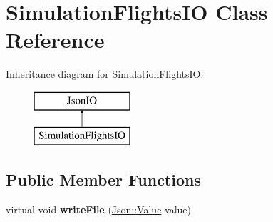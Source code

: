 \hypertarget{class_simulation_flights_i_o}{}\section{Simulation\+Flights\+IO Class Reference}
\label{class_simulation_flights_i_o}
Inheritance diagram for Simulation\+Flights\+IO\+:\begin{figure}[H]
\begin{center}
\leavevmode
\includegraphics[height=2.000000cm]{class_simulation_flights_i_o}
\end{center}
\end{figure}
\subsection*{Public Member Functions}
\begin{DoxyCompactItemize}
\item 
virtual void {\bfseries write\+File} (\hyperlink{class_json_1_1_value}{Json\+::\+Value} value)\hypertarget{class_simulation_flights_i_o_aab1dd1c43b626e70bc60d4b79d703597}{}\label{class_simulation_flights_i_o_aab1dd1c43b626e70bc60d4b79d703597}

\end{DoxyCompactItemize}
